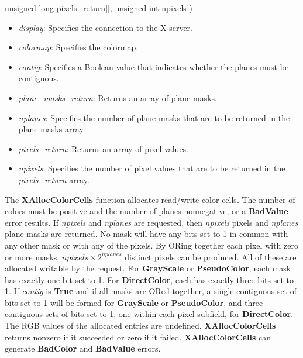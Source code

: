 \documentclass{report}
\begin{document}
\begin{itemize}
\begin{cppcode}
                    unsigned long pixels_return[],
                    unsigned int npixels
                )
            \end{cppcode}
            \begin{itemize}
                \item \textit{display}: Specifies the connection to the X server.
                \item \textit{colormap}: Specifies the colormap.
                \item \textit{contig}: Specifies a Boolean value that indicates whether the planes must be contiguous.
                \item \textit{plane\_masks\_return}: Returns an array of plane masks.
                \item \textit{nplanes}: Specifies the number of plane masks that are to be returned in the plane masks array.
                \item \textit{pixels\_return}: Returns an array of pixel values.
                \item \textit{npixels}: Specifies the number of pixel values that are to be returned in the \textit{pixels\_return} array.
            \end{itemize}
            \noindent
            The \textbf{XAllocColorCells} function allocates read/write color cells. The number of colors must be positive and the number of planes nonnegative, or a \textbf{BadValue} error results. If \textit{npixels} and \textit{nplanes} are requested, then \textit{npixels} pixels and \textit{nplanes} plane masks are returned. No mask will have any bits set to 1 in common with any other mask or with any of the pixels. By ORing together each pixel with zero or more masks, $\textit{npixels} \times 2^{\textit{nplanes}}$ distinct pixels can be produced. All of these are allocated writable by the request.
            \bigbreak \noindent
            For \textbf{GrayScale} or \textbf{PseudoColor}, each mask has exactly one bit set to 1. For \textbf{DirectColor}, each has exactly three bits set to 1. If \textit{contig} is \textbf{True} and if all masks are ORed together, a single contiguous set of bits set to 1 will be formed for \textbf{GrayScale} or \textbf{PseudoColor}, and three contiguous sets of bits set to 1, one within each pixel subfield, for \textbf{DirectColor}. The RGB values of the allocated entries are undefined. \textbf{XAllocColorCells} returns nonzero if it succeeded or zero if it failed.
            \bigbreak \noindent
            \textbf{XAllocColorCells} can generate \textbf{BadColor} and \textbf{BadValue} errors.

\end{itemize}
\end{document}
